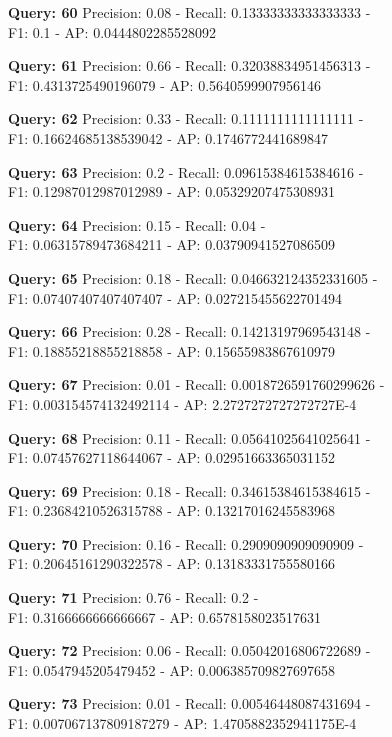 \documentclass[a4paper, 11pt]{article}
\begin{document}
\textbf{Query: 60}
Precision: 0.08 - Recall: 0.13333333333333333 - \\
F1: 0.1 - AP:  0.0444802285528092

\textbf{Query: 61}
Precision: 0.66 - Recall: 0.32038834951456313 - \\
F1: 0.4313725490196079 - AP:  0.5640599907956146

\textbf{Query: 62}
Precision: 0.33 - Recall: 0.1111111111111111 - \\
F1: 0.16624685138539042 - AP:  0.1746772441689847

\textbf{Query: 63}
Precision: 0.2 - Recall: 0.09615384615384616 - \\
F1: 0.12987012987012989 - AP:  0.05329207475308931

\textbf{Query: 64}
Precision: 0.15 - Recall: 0.04 - \\
F1: 0.06315789473684211 - AP:  0.03790941527086509

\textbf{Query: 65}
Precision: 0.18 - Recall: 0.046632124352331605 - \\
F1: 0.07407407407407407 - AP:  0.027215455622701494

\textbf{Query: 66}
Precision: 0.28 - Recall: 0.14213197969543148 - \\
F1: 0.18855218855218858 - AP:  0.15655983867610979

\textbf{Query: 67}
Precision: 0.01 - Recall: 0.0018726591760299626 - \\
F1: 0.003154574132492114 - AP:  2.2727272727272727E-4

\textbf{Query: 68}
Precision: 0.11 - Recall: 0.05641025641025641 - \\
F1: 0.07457627118644067 - AP:  0.02951663365031152

\textbf{Query: 69}
Precision: 0.18 - Recall: 0.34615384615384615 - \\
F1: 0.23684210526315788 - AP:  0.13217016245583968

\textbf{Query: 70}
Precision: 0.16 - Recall: 0.2909090909090909 - \\
F1: 0.20645161290322578 - AP:  0.13183331755580166

\textbf{Query: 71}
Precision: 0.76 - Recall: 0.2 - \\
F1: 0.3166666666666667 - AP: 0.6578158023517631

\textbf{Query: 72}
Precision: 0.06 - Recall: 0.05042016806722689 - \\
F1: 0.0547945205479452 - AP:  0.006385709827697658

\textbf{Query: 73}
Precision: 0.01 - Recall: 0.00546448087431694 - \\
F1: 0.007067137809187279 - AP:  1.4705882352941175E-4
\end{document}
